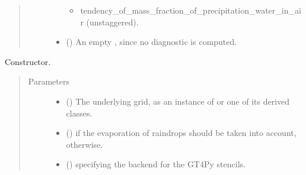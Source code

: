 \documentclass[letterpaper,10pt,english]{sphinxmanual}
\begin{document}
\begin{fulllineitems}
\begin{fulllineitems}
\begin{quote}
\begin{description}
\begin{itemize}
\begin{itemize}
\item {} 
tendency\_of\_mass\_fraction\_of\_precipitation\_water\_in\_air (unstaggered).

\end{itemize}

\item {} 
 () \textendash{} An empty {\hyperref[\detokenize{api:tasmania.storages.grid_data.GridData}]{}}, since no diagnostic is computed.

\end{itemize}


\end{description}\end{quote}

\end{fulllineitems}


\begin{fulllineitems}
\label{\detokenize{api:tasmania.parameterizations.slow_tendency_microphysics_kessler_wrf.SlowTendencyMicrophysicsKesslerWRF.__init__}}
Constructor.
\begin{quote}\begin{description}
\item[{Parameters}] \leavevmode\begin{itemize}
\item {} 
 () \textendash{} The underlying grid, as an instance of {\hyperref[\detokenize{api:tasmania.grids.grid_xyz.GridXYZ}]{}} or one of its derived classes.

\item {} 
 () \textendash{}  if the evaporation of raindrops should be taken into account,  otherwise.

\item {} 
 () \textendash{}  specifying the backend for the GT4Py stencils.


\end{itemize}
\end{description}
\end{quote}
\end{fulllineitems}
\end{fulllineitems}
\end{document}
